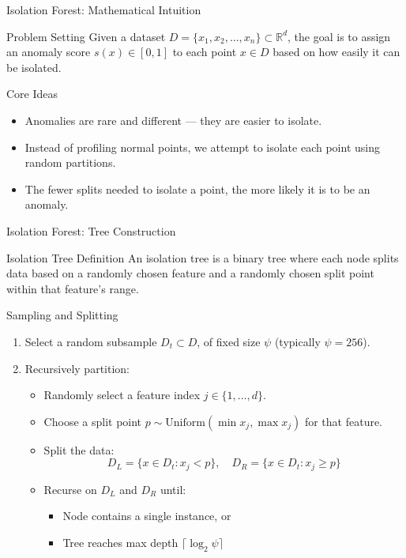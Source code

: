 \documentclass[aspectratio=169]{beamer}
\begin{document}
\begin{frame}[label={sec:org95aed9b}]{Isolation Forest: Mathematical Intuition}
\begin{block}{Problem Setting}
Given a dataset \(D = \{x_1, x_2, \ldots, x_n\} \subset \mathbb{R}^d\), the goal is to assign an \alert{anomaly score} \(s(x) \in [0, 1]\)
to each point \(x \in D\) based on how easily it can be
\alert{isolated}.
\end{block}
\end{frame}

\begin{frame}[label={sec:orgdae2e5d}]{Core Ideas}
\begin{itemize}
\item Anomalies are rare and different — they are easier to isolate.
\item Instead of profiling normal points, we attempt to isolate each point
using random partitions.
\item The \alert{fewer splits} needed to isolate a point, the more likely it is
to be an anomaly.
\end{itemize}
\end{frame}

\begin{frame}[label={sec:org147e460}]{Isolation Forest: Tree Construction}
\end{frame}

\begin{frame}[label={sec:orgfc58d2e}]{Isolation Tree Definition}
An \alert{isolation tree} is a binary tree where each node splits data based
on a randomly chosen feature and a randomly chosen split point within
that feature's range.
\end{frame}

\begin{frame}[label={sec:orgafa7f53}]{Sampling and Splitting}
\begin{enumerate}
\item Select a random subsample \(D_t \subset D\), of fixed size \(\psi\) (typically \(\psi = 256\)).

\item Recursively partition:
\begin{itemize}
\item Randomly select a feature index \(j \in \{1, \ldots, d\}\).
\item Choose a split point \(p \sim \text{Uniform}(\min x_j, \max x_j)\) for that feature.
\item Split the data: 
\[
     D_L = \{x \in D_t : x_j < p\}, \quad D_R = \{x \in D_t : x_j \geq p\}
     \]
\item Recurse on \(D_L\) and \(D_R\) until:
\begin{itemize}
\item Node contains a single instance, or
\item Tree reaches max depth \(\lceil \log_2 \psi \rceil\)
\end{itemize}
\end{itemize}
\end{enumerate}
\end{frame}
\end{document}

